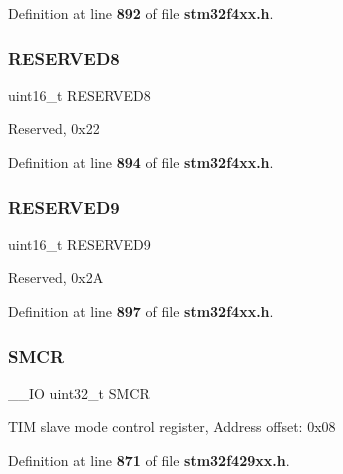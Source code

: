 Definition at line \textbf{ 892} of file \textbf{ stm32f4xx.\+h}.

\mbox{\label{structTIM__TypeDef_afc22764fbf9ee7ce28174d65d0260f18}} 
\subsubsection{R\+E\+S\+E\+R\+V\+E\+D8}
{\footnotesize\ttfamily uint16\+\_\+t R\+E\+S\+E\+R\+V\+E\+D8}

Reserved, 0x22 

Definition at line \textbf{ 894} of file \textbf{ stm32f4xx.\+h}.

\mbox{\label{structTIM__TypeDef_ad8b1fadb520f7a200ee0046e110edc79}} 
\subsubsection{R\+E\+S\+E\+R\+V\+E\+D9}
{\footnotesize\ttfamily uint16\+\_\+t R\+E\+S\+E\+R\+V\+E\+D9}

Reserved, 0x2A 

Definition at line \textbf{ 897} of file \textbf{ stm32f4xx.\+h}.

\mbox{\label{structTIM__TypeDef_a2870732a4fc2ecd7bbecfbcbbf5528b7}} 
\subsubsection{S\+M\+CR\hspace{0.1cm}{\footnotesize\ttfamily [1/2]}}
{\footnotesize\ttfamily \+\_\+\+\_\+\+IO uint32\+\_\+t S\+M\+CR}

T\+IM slave mode control register, Address offset\+: 0x08 

Definition at line \textbf{ 871} of file \textbf{ stm32f429xx.\+h}.

\mbox{\label{structTIM__TypeDef_a02758713abfe580460dd5bcd8762702a}} 
